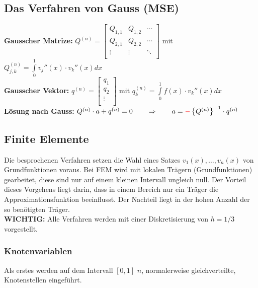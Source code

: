 \subsection{Das Verfahren von Gauss (MSE)}

\textbf{Gausscher Matrize: }
$Q^{(n)}=\begin{bmatrix}
	Q_{1,1}& Q_{1,2}&\cdots\\
	Q_{2,1}& Q_{2,2}&\cdots\\
	\vdots & \vdots &\ddots\\
\end{bmatrix}$ \qquad mit \qquad $Q_{j,k}^{(n)}=\int\limits_{0}^{1}{v_j''(x)\cdot v_k''(x) dx}$\\
\textbf{Gausscher Vektor: } 
$q^{(n)}=\begin{bmatrix}
	q_1\\
	q_2\\
	\vdots\\
\end{bmatrix}$ \qquad mit \qquad $q_{k}^{(n)}=\int\limits_{0}^{1}{f(x)\cdot v_k''(x) dx}$\\

\textbf{Lösung nach Gauss:} $Q^{(n)}\cdot a+q^{(n)}=0\qquad \Rightarrow \qquad a=\textcolor{red}{\mathbf{-}}\left\{Q^{(n)}\right\}^{-1}\cdot q^{(n)}$

\subsection{Finite Elemente}

Die besprochenen Verfahren setzen die Wahl eines Satzes $v_1(x),\ldots,v_n(x)$ von Grundfunktionen voraus. Bei FEM wird mit lokalen Trägern (Grundfunktionen) gearbeitet, diese sind nur auf einem kleinen Intervall ungleich null. Der Vorteil dieses Vorgehens liegt darin, dass in einem Bereich nur ein Träger die Approximationsfunktion beeinflusst. Der Nachteil liegt in der hohen Anzahl der so benötigten Träger.\\

\textbf{WICHTIG:} Alle Verfahren werden mit einer Diskretisierung von $h=1/3$
vorgestellt.

\subsubsection{Knotenvariablen}
Als erstes werden auf dem Intervall $[0,1]$ $n$, normalerweise gleichverteilte, Knotenstellen eingeführt.

